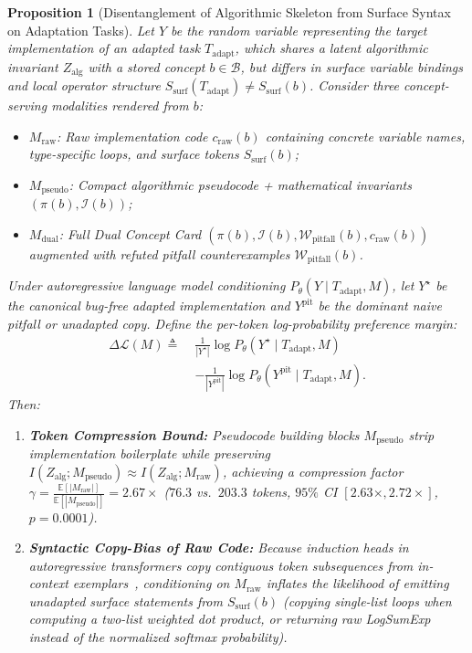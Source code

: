 \documentclass[10pt,twocolumn]{article}
\newtheorem{proposition}{Proposition}
\begin{document}
\begin{proposition}[Disentanglement of Algorithmic Skeleton from Surface Syntax on Adaptation Tasks]
\label{prop:modality_adaptation}
Let $Y$ be the random variable representing the target implementation of an adapted task $T_{\text{adapt}}$, which shares a latent algorithmic invariant $Z_{\text{alg}}$ with a stored concept $b \in \mathcal{B}$, but differs in surface variable bindings and local operator structure $S_{\text{surf}}(T_{\text{adapt}}) \neq S_{\text{surf}}(b)$. Consider three concept-serving modalities rendered from $b$:
\begin{itemize}
    \item $M_{\text{raw}}$: Raw implementation code $c_{\text{raw}}(b)$ containing concrete variable names, type-specific loops, and surface tokens $S_{\text{surf}}(b)$;
    \item $M_{\text{pseudo}}$: Compact algorithmic pseudocode + mathematical invariants $(\pi(b), \mathcal{I}(b))$;
    \item $M_{\text{dual}}$: Full Dual Concept Card $(\pi(b), \mathcal{I}(b), \mathcal{W}_{\text{pitfall}}(b), c_{\text{raw}}(b))$ augmented with refuted pitfall counterexamples $\mathcal{W}_{\text{pitfall}}(b)$.
\end{itemize}
Under autoregressive language model conditioning $P_\theta(Y \mid T_{\text{adapt}}, M)$, let $Y^{\star}$ be the canonical bug-free adapted implementation and $Y^{\text{pit}}$ be the dominant naive pitfall or unadapted copy. Define the per-token log-probability preference margin:
\begin{equation}
\begin{aligned}
    \Delta \mathcal{L}(M) \triangleq\;& \frac{1}{|Y^{\star}|} \log P_\theta(Y^{\star} \mid T_{\text{adapt}}, M) \\
    &- \frac{1}{|Y^{\text{pit}}|} \log P_\theta(Y^{\text{pit}} \mid T_{\text{adapt}}, M).
\end{aligned}
\end{equation}
Then:
\begin{enumerate}
    \item \textbf{Token Compression Bound:} Pseudocode building blocks $M_{\text{pseudo}}$ strip implementation boilerplate while preserving $I(Z_{\text{alg}}; M_{\text{pseudo}}) \approx I(Z_{\text{alg}}; M_{\text{raw}})$, achieving a compression factor $\gamma = \frac{\mathbb{E}[|M_{\text{raw}}|]}{\mathbb{E}[|M_{\text{pseudo}}|]} = 2.67\times$ ($76.3$ vs.\ $203.3$ tokens, $95\%$ CI $[2.63\times, 2.72\times]$, $p = 0.0001$).
    \item \textbf{Syntactic Copy-Bias of Raw Code:} Because induction heads in autoregressive transformers copy contiguous token subsequences from in-context exemplars~\cite{olsson2022context}, conditioning on $M_{\text{raw}}$ inflates the likelihood of emitting unadapted surface statements from $S_{\text{surf}}(b)$ (copying single-list loops when computing a two-list weighted dot product, or returning raw LogSumExp instead of the normalized softmax probability).

\end{enumerate}
\end{proposition}
\end{document}
